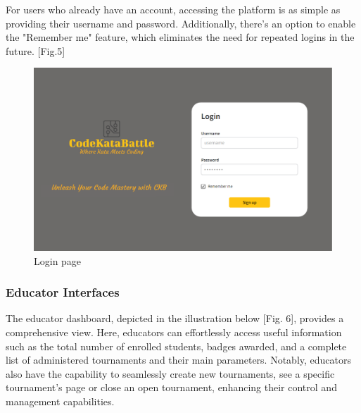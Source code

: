 \documentclass[12pt,oneside,a4paper]{article}
\begin{document}
\pagebreak

\begin{flushleft}
For users who already have an account, accessing the platform is as simple as providing their username and password. Additionally, there's an option to enable the "Remember me" feature, which eliminates the need for repeated logins in the future. [Fig.5]    
\end{flushleft}

\begin{figure}[htbp]
    \centering
    \includegraphics[width=1\linewidth]{Images/Interfaces/Login.png}
    \caption{Login page}
    \label{fig:enter-label}
\end{figure}

\pagebreak

\subsubsection{Educator Interfaces}
\begin{flushleft}
The educator dashboard, depicted in the illustration below [Fig. 6], provides a comprehensive view. Here, educators can effortlessly access useful information such as the total number of enrolled students, badges awarded, and a complete list of administered tournaments and their main parameters. Notably, educators also have the capability to seamlessly create new tournaments, see a specific tournament's page or close an open tournament, enhancing their control and management capabilities.    
\end{flushleft}
\end{document}

